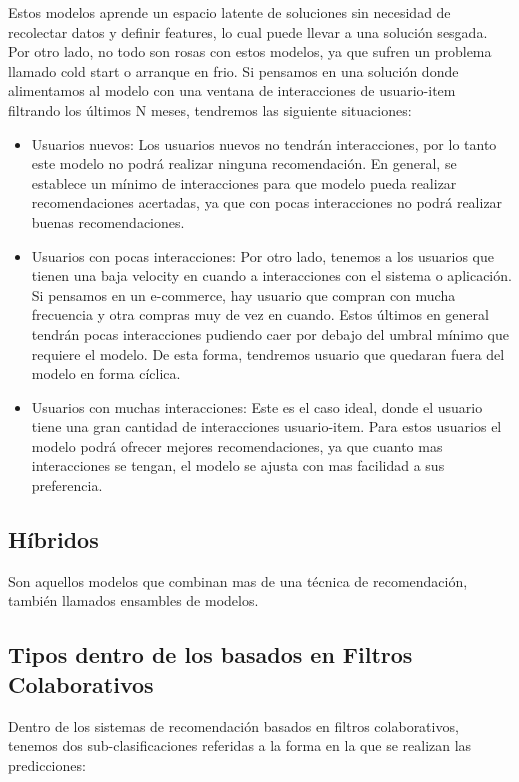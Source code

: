 \documentclass[11pt,a4paper,twoside]{thesis}
\begin{document}
Estos modelos aprende un espacio latente de soluciones sin necesidad de recolectar datos y definir features, lo cual puede llevar a una solución sesgada. Por otro lado, no todo son rosas con estos modelos, ya que sufren un problema llamado cold start o arranque en frio. Si pensamos en una solución donde alimentamos al modelo con una ventana de interacciones de usuario-item filtrando los últimos N meses, tendremos las siguiente situaciones:

\begin{itemize}
	\item Usuarios nuevos: Los usuarios nuevos no tendrán interacciones, por lo tanto este modelo no podrá realizar ninguna recomendación. En general, se establece un mínimo de interacciones para que modelo pueda realizar recomendaciones acertadas, ya que con pocas interacciones no podrá realizar buenas recomendaciones.
	\item Usuarios con pocas interacciones: Por otro lado, tenemos a los usuarios que tienen una baja velocity en cuando a interacciones con el sistema o aplicación. Si pensamos en un e-commerce, hay usuario que compran con mucha frecuencia y otra compras muy de vez en cuando. Estos últimos en general tendrán pocas interacciones pudiendo caer por debajo del umbral mínimo que requiere el modelo. De esta forma, tendremos usuario que quedaran fuera del modelo en forma cíclica.
	\item Usuarios con muchas interacciones: Este es el caso ideal, donde el usuario tiene una gran cantidad de interacciones usuario-item. Para estos usuarios el modelo podrá ofrecer mejores recomendaciones, ya que cuanto mas interacciones se tengan, el modelo se ajusta con mas facilidad a sus preferencia.

\end{itemize}


\subsection{Híbridos}

Son aquellos modelos que combinan mas de una técnica de recomendación, también llamados ensambles de modelos.

\subsection{Tipos dentro de los basados en Filtros Colaborativos} 

Dentro de los sistemas de recomendación basados en filtros colaborativos, tenemos dos sub-clasificaciones referidas a la forma en la que se realizan las predicciones:
\end{document}

